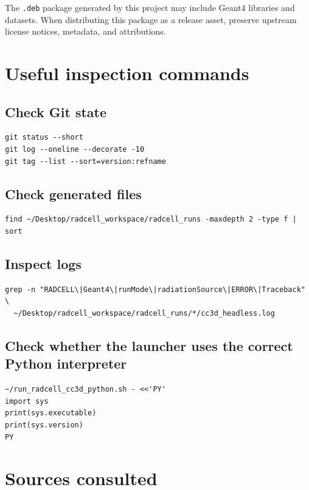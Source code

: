 \documentclass[11pt,a4paper,twoside,pdftex]{refrep}
\begin{document}
The \texttt{.deb} package generated by this project may include Geant4 libraries and datasets. When distributing this package as a release asset, preserve upstream license notices, metadata, and attributions.

\chapter{Useful inspection commands}

\section{Check Git state}

\begin{lstlisting}
git status --short
git log --oneline --decorate -10
git tag --list --sort=version:refname
\end{lstlisting}

\section{Check generated files}

\begin{lstlisting}
find ~/Desktop/radcell_workspace/radcell_runs -maxdepth 2 -type f | sort
\end{lstlisting}

\section{Inspect logs}

\begin{lstlisting}
grep -n "RADCELL\|Geant4\|runMode\|radiationSource\|ERROR\|Traceback" \
  ~/Desktop/radcell_workspace/radcell_runs/*/cc3d_headless.log
\end{lstlisting}

\section{Check whether the launcher uses the correct Python interpreter}

\begin{lstlisting}
~/run_radcell_cc3d_python.sh - <<'PY'
import sys
print(sys.executable)
print(sys.version)
PY
\end{lstlisting}

\chapter{Sources consulted}
\end{document}
